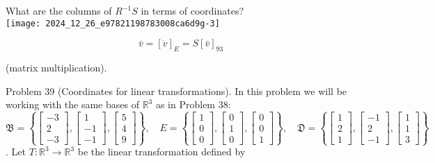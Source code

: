 \documentclass[10pt]{article}
\begin{document}
What are the columns of $R^{-1} S$ in terms of coordinates?\\
\texttt{[image: 2024\_12\_26\_e97821198783008ca6d9g-3]}

$$
\bar{v}=[\dot{v}]_{E}=S[\bar{v}]_{93}
$$

(matrix multiplication).

Problem 39 (Coordinates for linear transformations). In this problem we will be working with the same bases of $\mathbb{R}^{3}$ as in Problem 38:\\
$\mathfrak{B}=\left\{\left[\begin{array}{c}-3 \\ 2 \\ -3\end{array}\right],\left[\begin{array}{c}1 \\ -1 \\ -1\end{array}\right],\left[\begin{array}{l}5 \\ 4 \\ 9\end{array}\right]\right\}, \quad E=\left\{\left[\begin{array}{l}1 \\ 0 \\ 0\end{array}\right],\left[\begin{array}{l}0 \\ 1 \\ 0\end{array}\right],\left[\begin{array}{l}0 \\ 0 \\ 1\end{array}\right]\right\}, \quad \mathfrak{D}=\left\{\left[\begin{array}{l}1 \\ 2 \\ 1\end{array}\right],\left[\begin{array}{c}-1 \\ 2 \\ -1\end{array}\right],\left[\begin{array}{l}1 \\ 1 \\ 3\end{array}\right]\right\}$\\
. Let $T: \mathbb{R}^{3} \rightarrow \mathbb{R}^{3}$ be the linear transformation defined by
\end{document}
